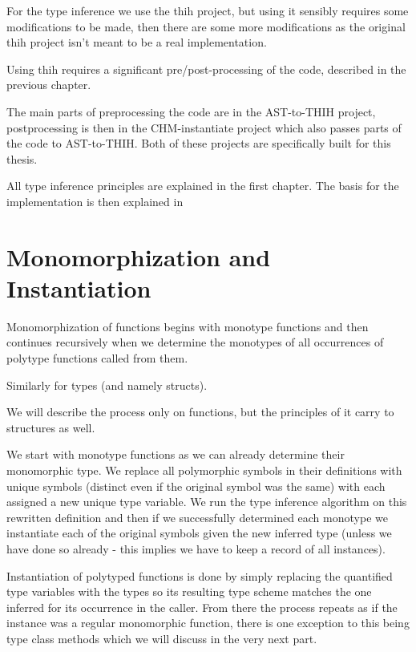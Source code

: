 For the type inference we use the thih project, %
but using it sensibly requires some modifications to be made, then there are some more modifications as the original thih project isn't meant to be a real implementation.

Using thih requires a significant pre/post-processing of the code, described in the previous chapter. %

The main parts of preprocessing the code are in the AST-to-THIH project, postprocessing is then in the CHM-instantiate project which also passes parts of the code to AST-to-THIH. Both of these projects are specifically built for this thesis.

All type inference principles are explained in the first chapter. The basis for the implementation is then explained in %

\section{Monomorphization and Instantiation} %

Monomorphization of functions begins with monotype functions and then continues recursively when we determine the monotypes of all occurrences of polytype functions called from them.

Similarly for types (and namely structs).

We will describe the process only on functions, but the principles of it carry to structures as well.

We start with monotype functions as we can already determine their monomorphic type. We replace all polymorphic symbols in their definitions with unique symbols (distinct even if the original symbol was the same) with each assigned a new unique type variable. We run the type inference algorithm on this rewritten definition and then if we successfully determined each monotype we instantiate each of the original symbols given the new inferred type (unless we have done so already - this implies we have to keep a record of all instances).

Instantiation of polytyped functions is done by simply replacing the quantified type variables with the types so its resulting type scheme matches the one inferred for its occurrence in the caller. From there the process repeats as if the instance was a regular monomorphic function, there is one exception to this being type class methods which we will discuss in the very next part.

